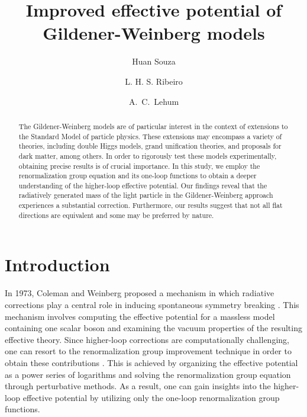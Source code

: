 \documentclass[11pt,a4paper,english,superscriptaddress,preprint,aps,prd]{revtex4}
\begin{document}
\title{Improved effective potential of Gildener-Weinberg models}

\author{Huan Souza}

\author{L. H. S. Ribeiro}

\author{A.~C.~Lehum}


\begin{abstract}
The Gildener-Weinberg models are of particular interest in the context of extensions to the Standard Model of particle physics. These extensions may encompass a variety of theories, including double Higgs models, grand unification theories, and proposals for dark matter, among others. In order to rigorously test these models experimentally, obtaining precise results is of crucial importance. In this study, we employ the renormalization group equation and its one-loop functions to obtain a deeper understanding of the higher-loop effective potential. Our findings reveal that the radiatively generated mass of the light particle in the Gildener-Weinberg approach experiences a substantial correction. Furthermore, our results suggest that not all flat directions are equivalent and some may be preferred by nature.
\end{abstract}

\maketitle

\section{Introduction}\label{Introduction}

In 1973, Coleman and Weinberg proposed a mechanism in which radiative corrections play a central role in inducing spontaneous symmetry breaking \cite{Coleman:1973jx}. This mechanism involves computing the effective potential for a massless model containing one scalar boson and examining the vacuum properties of the resulting effective theory. Since higher-loop corrections are computationally challenging, one can resort to the renormalization group improvement technique in order to obtain these contributions \cite{McKeon:1998tr,Souza:2020hjd,Elias:2003zm,Chishtie:2005hr,Elias:2004bc,Lehum:2019msl,Meissner:2008uw,Dias:2014txa,Quinto:2014zaa}. This is achieved by organizing the effective potential as a power series of logarithms and solving the renormalization group equation through perturbative methods. As a result, one can gain insights into the higher-loop effective potential by utilizing only the one-loop renormalization group functions.
\end{document}
